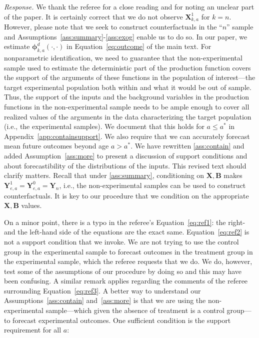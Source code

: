 \noindent \textit{Response.} We thank the referee for a close reading and for noting an unclear part of the paper. It is certainly correct that we do not observe $\bm{X}_{k,a}^1$ for $k = n$. However, please note that we seek to construct counterfactuals in the ``$n$'' sample and Assumptions~\ref{ass:summary}-\ref{ass:exog} enable us to do so. In our paper, we estimate $\bm{\phi}_{k,a}^d \left( \cdot, \cdot \right)$ in Equation~\eqref{eq:outcome} of the main text. For nonparametric identification, we need to guarantee that the non-experimental sample used to estimate the deterministic part of the production function covers the support of the arguments of these functions in the population of interest---the target experimental population both within and what it would be out of sample. Thus, the support of the inputs and the background variables in the production functions in the non-experimental sample needs to be ample enough to cover all realized values of the arguments in the data characterizing the target population (i.e., the experimental samples). We document that this holds for $a \leq a^*$ in Appendix~\ref{app:containsupport}. We also require that we can accurately forecast mean future outcomes beyond age $a > a^*$. We have rewritten \ref{ass:contain} and added Assumption~\ref{ass:more} to present a discussion of support conditions and about forecastibility of the distributions of the inputs. This revised text should clarify matters. Recall that under \ref{ass:summary}, conditioning on $\bm{X}, \bm{B}$ makes $\bm{Y}^1_{e,a} = \bm{Y}^0_{e,a} = \bm{Y}_n$, i.e., the non-experimental samples can be used to construct counterfactuals. It is key to our procedure that we condition on the appropriate $\bm{X},\bm{B}$ values.

On a minor point, there is a typo in the referee's Equation~\eqref{eq:ref1}: the right- and the left-hand side of the equations are the exact same. Equation~\eqref{eq:ref2} is not a support condition that we invoke. We are not trying to use the control group in the experimental sample to forecast outcomes in the treatment group in the experimental sample, which the referee requests that we do. We do, however, test some of the assumptions of our procedure by doing so and this may have been confusing. A similar remark applies regarding the comments of the referee surrounding Equation~\eqref{eq:ref3}. A better way to understand our Assumptions~\ref{ass:contain} and~\ref{ass:more} is that we are using the non-experimental sample---which given the absence of treatment is a control group---to forecast experimental outcomes. One sufficient condition is the support requirement for all $a$:

